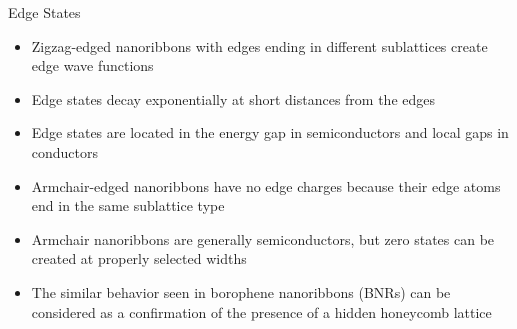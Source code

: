 \documentclass[handout,t]{beamer}
\begin{document}
\begin{frame}{Edge States}
	\begin{itemize}
		\item Zigzag-edged nanoribbons with edges ending in different sublattices create edge wave functions
		\item Edge states decay exponentially at short distances from the edges
		\item Edge states are located in the energy gap in semiconductors and local gaps in conductors
		\item Armchair-edged nanoribbons have no edge charges because their edge atoms end in the same sublattice type
		\item Armchair nanoribbons are generally semiconductors, but zero states can be created at properly selected widths
		\item The similar behavior seen in borophene nanoribbons (BNRs) can be considered as a confirmation of the presence of a hidden honeycomb lattice
	\end{itemize}
\end{frame}
\end{document}
